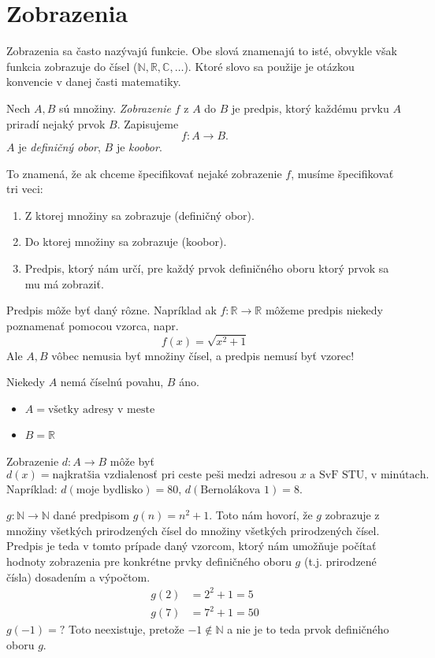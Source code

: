 \section{Zobrazenia}

Zobrazenia sa často nazývajú funkcie. Obe slová znamenajú to isté, obvykle však funkcia zobrazuje do čísel ($\mathbb{N}, \mathbb{R}, \mathbb{C}, \dots$).
Ktoré slovo sa použije je otázkou konvencie v danej časti matematiky.

\begin{definition}[zobrazenie]\label{def:zobrazenie}
Nech $A, B$ sú množiny.
\emph{Zobrazenie} $f$ z $A$ do $B$ je predpis, ktorý každému prvku
$A$ priradí nejaký prvok $B$.
Zapisujeme 
\[
f \colon A \to B.
\]
$A$ je \emph{definičný obor}, $B$ je \emph{koobor}.
\end{definition}

To znamená, že ak chceme špecifikovať nejaké zobrazenie $f$, musíme špecifikovať tri
veci:
\begin{enumerate}
    \item Z ktorej množiny sa zobrazuje (definičný obor).
    \item Do ktorej množiny sa zobrazuje (koobor).
    \item Predpis, ktorý nám určí, pre každý prvok definičného oboru ktorý prvok sa mu má zobraziť.
\end{enumerate}

Predpis môže byť daný rôzne.
Napríklad ak $f \colon \mathbb{R} \to \mathbb{R}$ môžeme predpis niekedy poznamenať pomocou vzorca, napr.
\[
f(x) = \sqrt{x^2+1}
\]
Ale $A, B$ vôbec nemusia byť množiny čísel, a predpis nemusí byť vzorec!
\begin{example}
Niekedy $A$ nemá číselnú povahu, $B$ áno.
\begin{itemize}
    \item $A = \text{všetky adresy v meste}$
    \item $B = \mathbb{R}$
\end{itemize}
Zobrazenie $d \colon A \to B$ môže byť \[
d(x) = \text{najkratšia vzdialenosť pri ceste peši medzi adresou $x$ a SvF STU, v minútach}.\]
Napríklad: $d(\text{moje bydlisko}) = 80$, $d(\text{Bernolákova 1})=8$.
\end{example}


\begin{example}
$g \colon \mathbb{N} \rightarrow \mathbb{N}$ dané predpisom $g(n) = n^2 + 1$.
Toto nám hovorí, že $g$ zobrazuje z množiny všetkých prirodzených čísel do množiny všetkých prirodzených čísel.
Predpis je teda v tomto prípade daný vzorcom, ktorý nám umožňuje počítať hodnoty zobrazenia pre konkrétne prvky definičného oboru $g$ (t.j. prirodzené čísla) dosadením a výpočtom.
\begin{align*}
    g(2) &= 2^2 + 1 = 5 \\
    g(7) &= 7^2 + 1 = 50
\end{align*}
$g(-1) = ?$ Toto neexistuje, pretože $-1 \notin \mathbb{N}$ a nie je to teda prvok definičného oboru $g$.
\end{example}

